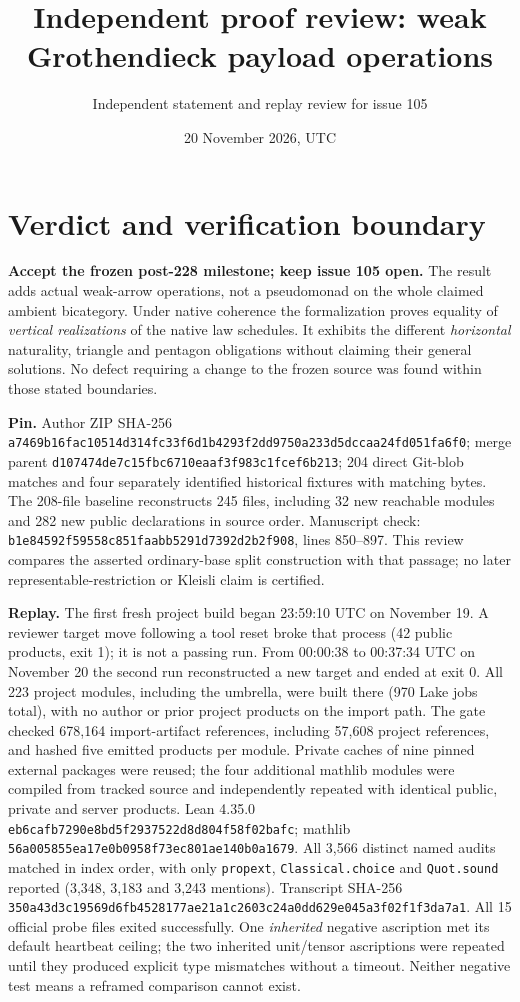 \documentclass[11pt]{article}
\title{Independent proof review: weak Grothendieck payload operations}
\author{Independent statement and replay review for issue 105}
\date{20 November 2026, UTC}
\newcommand{\code}{\nolinkurl}
\begin{document}
\maketitle
\section*{Verdict and verification boundary}
\textbf{Accept the frozen post-228 milestone; keep issue 105 open.} The result adds actual weak-arrow operations, not a pseudomonad on the whole claimed ambient bicategory. Under native coherence the formalization proves equality of \emph{vertical realizations} of the native law schedules. It exhibits the different \emph{horizontal} naturality, triangle and pentagon obligations without claiming their general solutions. No defect requiring a change to the frozen source was found within those stated boundaries.

\textbf{Pin.} Author ZIP SHA-256 \code{a7469b16fac10514d314fc33f6d1b4293f2dd9750a233d5dccaa24fd051fa6f0}; merge parent \code{d107474de7c15fbc6710eaaf3f983c1fcef6b213}; 204 direct Git-blob matches and four separately identified historical fixtures with matching bytes. The 208-file baseline reconstructs 245 files, including 32 new reachable modules and 282 new public declarations in source order. Manuscript check: \code{b1e84592f59558c851faabb5291d7392d2b2f908}, lines 850--897. This review compares the asserted ordinary-base split construction with that passage; no later representable-restriction or Kleisli claim is certified.

\textbf{Replay.} The first fresh project build began 23:59:10 UTC on November 19. A reviewer target move following a tool reset broke that process (42 public products, exit 1); it is not a passing run. From 00:00:38 to 00:37:34 UTC on November 20 the second run reconstructed a new target and ended at exit 0. All 223 project modules, including the umbrella, were built there (970 Lake jobs total), with no author or prior project products on the import path. The gate checked 678,164 import-artifact references, including 57,608 project references, and hashed five emitted products per module. Private caches of nine pinned external packages were reused; the four additional mathlib modules were compiled from tracked source and independently repeated with identical public, private and server products. Lean 4.35.0 \code{eb6cafb7290e8bd5f2937522d8d804f58f02bafc}; mathlib \code{56a005855ea17e0b0958f73ec801ae140b0a1679}. All 3,566 distinct named audits matched in index order, with only \code{propext}, \code{Classical.choice} and \code{Quot.sound} reported (3,348, 3,183 and 3,243 mentions). Transcript SHA-256 \code{350a43d3c19569d6fb4528177ae21a1c2603c24a0dd629e045a3f02f1f3da7a1}. All 15 official probe files exited successfully. One \emph{inherited} negative ascription met its default heartbeat ceiling; the two inherited unit/tensor ascriptions were repeated until they produced explicit type mismatches without a timeout. Neither negative test means a reframed comparison cannot exist.
\end{document}
